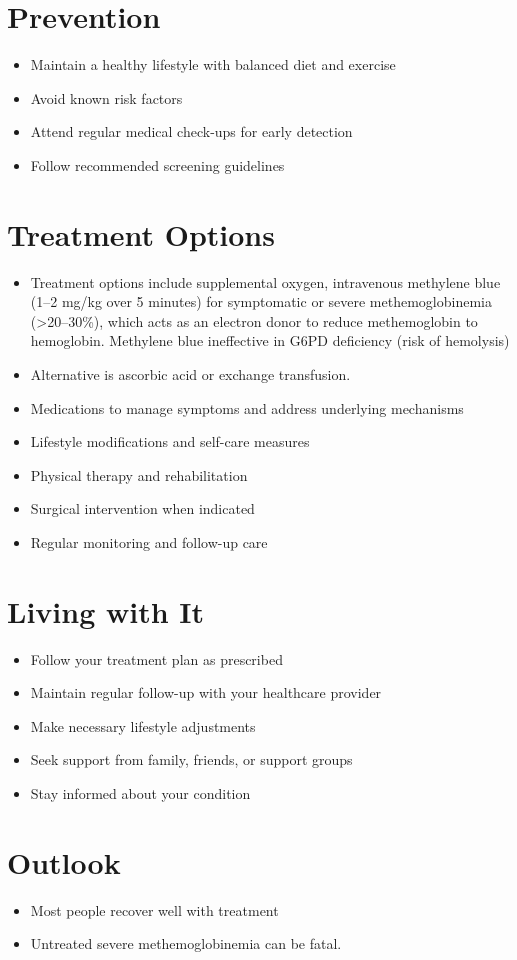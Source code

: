 \section{Prevention}
\begin{itemize}[noitemsep]
  \item Maintain a healthy lifestyle with balanced diet and exercise
  \item Avoid known risk factors
  \item Attend regular medical check-ups for early detection
  \item Follow recommended screening guidelines
\end{itemize}
\section{Treatment Options}
\begin{itemize}[noitemsep]
  \item Treatment options include supplemental oxygen, intravenous methylene blue (1--2 mg/kg over 5 minutes) for symptomatic or severe methemoglobinemia (>20--30\%), which acts as an electron donor to reduce methemoglobin to hemoglobin. Methylene blue ineffective in G6PD deficiency (risk of hemolysis)
  \item Alternative is ascorbic acid or exchange transfusion.
  \item Medications to manage symptoms and address underlying mechanisms
  \item Lifestyle modifications and self-care measures
  \item Physical therapy and rehabilitation
  \item Surgical intervention when indicated
  \item Regular monitoring and follow-up care
\end{itemize}
\section{Living with It}
\begin{itemize}[noitemsep]
  \item Follow your treatment plan as prescribed
  \item Maintain regular follow-up with your healthcare provider
  \item Make necessary lifestyle adjustments
  \item Seek support from family, friends, or support groups
  \item Stay informed about your condition
\end{itemize}
\section{Outlook}
\begin{itemize}[noitemsep]
  \item Most people recover well with treatment
  \item Untreated severe methemoglobinemia can be fatal.
\end{itemize}
